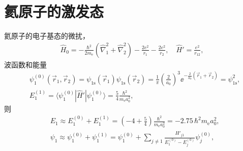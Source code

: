 \section{氦原子的激发态}
氦原子的电子基态的微扰，
\begin{align}
    \hat H_0 = - \frac{\hbar^2}{2m_{\mathrm e}} (\hat \nabla_1^2 + \hat \nabla_2^2) - \frac{2e^2}{r_1} - \frac{2e^2}{r_2}, \quad \hat H' = \frac{e^2}{r_{12}},
\end{align}
波函数和能量
\begin{align}
    &\psi_1^{(0)}(\vec r_1, \vec r_2) = \psi_{\text{1s}} (\vec r_1) \psi_{\text{1s}} (\vec r_2) = \frac 1\pi \left(\frac2{a_0}\right)^3 \ee^{-\frac2{a_0}(\vec r_1 + \vec r_2)} = \psi_{\text{1s}}^2,
    \\
    &E_1^{(1)} =  \langle \psi_1^{(0)} | \hat H' | \psi_1^{(0)} \rangle = \frac 54 \frac{\hbar^2}{m_\mathrm{e} a_0^2}, 
\end{align}
则
\begin{align}
    &E_1 \approx  E_1^{(0)} + E_1^{(1)} = \left(-4 + \frac54\right) \frac{\hbar^2}{m_\mathrm{e}a_0^2} = -2.75 \,{\hbar^2}{m_\mathrm{e}a_0^2},\\
    &\psi_1 \approx  \psi_1^{(0)} + \psi_1^{(1)} = \psi_1^{(0)} + \sum_{j\neq1} \frac{H'_{j1}}{E_1^{(0)} - E_j^{(0)}} \psi_j^{(0)},
\end{align}

